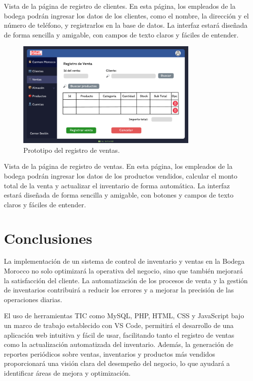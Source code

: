 \documentclass{article}
\begin{document}
Vista de la página de registro de clientes. En esta página, los empleados de la bodega podrán ingresar los datos de los clientes, como el nombre, la dirección y el número de teléfono, y registrarlos en la base de datos. La interfaz estará diseñada de forma sencilla y amigable, con campos de texto claros y fáciles de entender.

\begin{figure}[H]
  \centering
  \includegraphics[width=0.8\textwidth]{./assets/venta.png}
  \caption{Prototipo del registro de ventas.}
\end{figure}

Vista de la página de registro de ventas. En esta página, los empleados de la bodega podrán ingresar los datos de los productos vendidos, calcular el monto total de la venta y actualizar el inventario de forma automática. La interfaz estará diseñada de forma sencilla y amigable, con botones y campos de texto claros y fáciles de entender.

\newpage

\section{Conclusiones}

La implementación de un sistema de control de inventario y ventas en la Bodega Morocco no solo optimizará la operativa del negocio, sino que también mejorará la satisfacción del cliente. La automatización de los procesos de venta y la gestión de inventarios contribuirá a reducir los errores y a mejorar la precisión de las operaciones diarias.

El uso de herramientas TIC como MySQL, PHP, HTML, CSS y JavaScript bajo un marco de trabajo establecido con VS Code, permitirá el desarrollo de una aplicación web intuitiva y fácil de usar, facilitando tanto el registro de ventas como la actualización automatizada del inventario. Además, la generación de reportes periódicos sobre ventas, inventarios y productos más vendidos proporcionará una visión clara del desempeño del negocio, lo que ayudará a identificar áreas de mejora y optimización.
\end{document}
